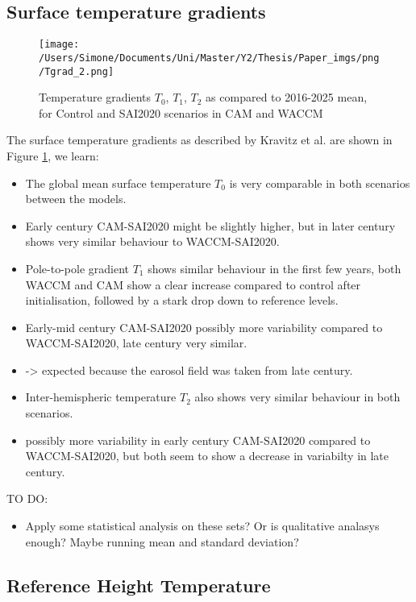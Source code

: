\subsection{Surface temperature gradients}

\begin{figure}[H]
	\centering
	\texttt{[image: /Users/Simone/Documents/Uni/Master/Y2/Thesis/Paper\_imgs/png/Tgrad\_2.png]}
	\caption{Temperature gradients $T_0$, $T_1$, $T_2$ as compared to 2016-2025 mean, for Control and SAI2020 scenarios in CAM and WACCM}
	\label{fig:Tgrad}
\end{figure}

The surface temperature gradients as described by Kravitz et al. are shown in Figure \ref{fig:Tgrad}, we learn:
\begin{itemize}
	\item The global mean surface temperature $T_0$ is very comparable in both scenarios between the models.
	\item Early century CAM-SAI2020 might be slightly higher, but in later century shows very similar behaviour to WACCM-SAI2020.
	\item Pole-to-pole gradient $T_1$ shows similar behaviour in the first few years, both WACCM and CAM show a clear increase compared to control after initialisation, followed by a stark drop down to reference levels. 
	\item Early-mid century CAM-SAI2020 possibly more variability compared to WACCM-SAI2020, late century very similar.
	\item -> expected because the earosol field was taken from late century.
	\item Inter-hemispheric temperature $T_2$ also shows very similar behaviour in both scenarios. 
	\item possibly more variability in early century CAM-SAI2020 compared to WACCM-SAI2020, but both seem to show a decrease in variabilty in late century. 
\end{itemize}

TO DO:
\begin{itemize}
	\item Apply some statistical analysis on these sets? Or is qualitative analasys enough? Maybe running mean and standard deviation?
\end{itemize}


\subsection{Reference Height Temperature}

